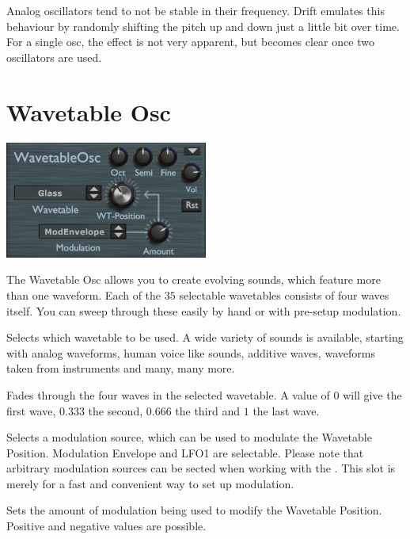 {Analog oscillators tend to not be stable in their frequency. Drift emulates this behaviour by randomly shifting the pitch up and down just a little bit over time. For a single osc, the effect is not very apparent, but becomes clear once two oscillators are used.}

\section{Wavetable Osc}
\begin{center}
    \includegraphics[width=0.5\textwidth]{graphics/wavetable_osc.png}
\end{center}
The Wavetable Osc allows you to create evolving sounds, which feature more than one waveform. Each of the $35$ selectable wavetables consists of four waves itself. You can sweep through these easily by hand or with pre-setup modulation.

{Selects which wavetable to be used. A wide variety of sounds is available, starting with analog waveforms, human voice like sounds, additive waves, waveforms taken from instruments and many, many more.}

{Fades through the four waves in the selected wavetable. A value of $0$ will give the first wave, $0.333$ the second, $0.666$ the third and $1$ the last wave.}

{Selects a modulation source, which can be used to modulate the Wavetable Position. Modulation Envelope and LFO1 are selectable. Please note that arbitrary modulation sources can be sected when working with the \modmatrix. This slot is merely for a fast and convenient way to set up modulation.}

{Sets the amount of modulation being used to modify the Wavetable Position. Positive and negative values are possible.}

